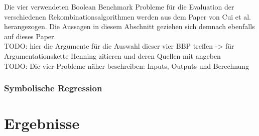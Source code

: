 Die vier verwendeten Boolean Benchmark Probleme für die Evaluation der verschiedenen Rekombinationsalgorithmen werden aus dem Paper von Cui et al. herangezogen.
Die Aussagen in diesem Abschnitt geziehen sich demnach ebenfalls auf dieses Paper.\cite{cui_equidistant_2023}\\
TODO: hier die Argumente für die Auswahl dieser vier BBP treffen -> für Argumentationskette Henning zitieren und deren Quellen mit angeben\\

TODO: Die vier Probleme näher beschreiben: Inputs, Outputs und Berechnung

\subsubsection{Symbolische Regression}
\label{subsubsec:symbolicRegression}

\section{Ergebnisse}
\label{Ergebnisse}

